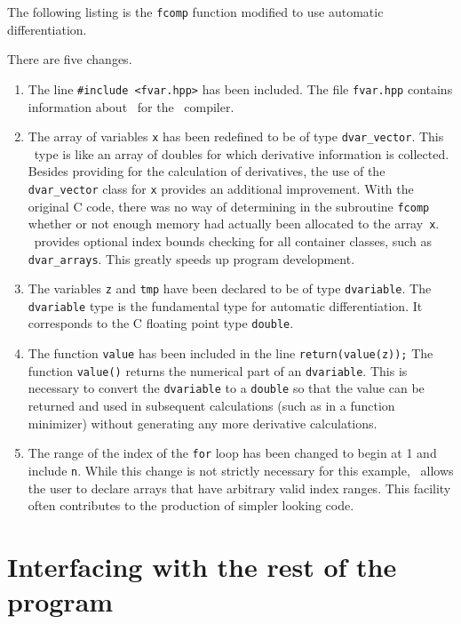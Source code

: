 \documentclass{admbmanual}
\begin{document}
The following listing is the \texttt{fcomp} function
modified to use automatic differentiation.

\noindent There are five changes.
\begin{enumerate}

\item The line \texttt{\#include <fvar.hpp>} has been included. The file
\texttt{fvar.hpp}
contains information about \scAD\ for the \cplus\ compiler.

\item The array of variables \texttt{x} has been 
redefined to be of type \texttt{dvar\_vector}. This \scAD\ type is like
an array of doubles for which derivative information is collected. 
Besides providing for the calculation of derivatives, the use of the 
\texttt{dvar\_vector} class for \texttt{x} provides an additional improvement.
With the original C code, there was no way of determining in the subroutine
\texttt{fcomp} whether or not
enough memory had actually been allocated to the array~\texttt{x}.
\scAD\ provides optional index bounds checking for all container
classes, such as \texttt{dvar\_arrays}. This greatly speeds up 
program development.

\item The variables \texttt{z} and \texttt{tmp} have been declared to be
of type \texttt{dvariable}.  The \texttt{dvariable} type
is the fundamental type for automatic differentiation. It corresponds
to the C floating point type \texttt{double}.

\item The function \texttt{value} has been included
in the line \texttt{return(value(z));}
The function  \texttt{value()} returns the numerical part of an
\texttt{dvariable}. This is necessary to convert the \texttt{dvariable}
to a \texttt{double} so that the value can be returned and used in
subsequent calculations (such as in a function minimizer) without
generating any more derivative calculations.

\item The range of the index of the \texttt{for} loop has been changed
to begin at 1 and include \texttt{n}. While this change is not strictly necessary
for this example,
\scAD\ allows the user to declare arrays that have arbitrary valid
index ranges. This facility often contributes to the production 
of simpler looking code.

\end{enumerate}



\section{Interfacing with the rest of the program}
\end{document}
